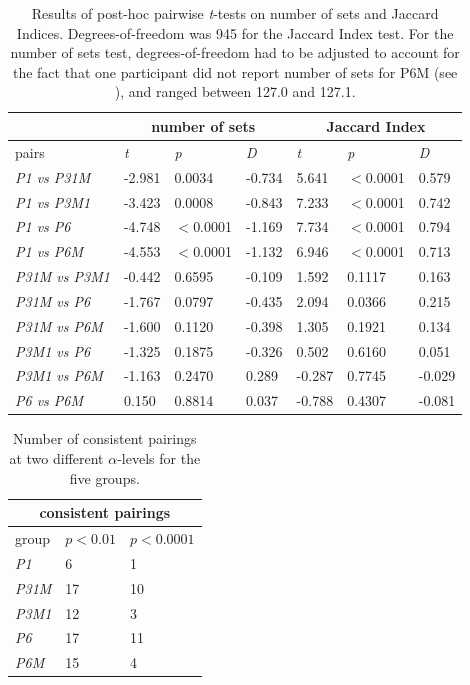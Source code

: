 \documentclass[11pt, twoside]{article}
\begin{document}
\begin{table}[H]
	\centering
	\begin{tabular}{ |p{3cm}||p{1.5cm}|p{1.5cm}|p{1.5cm}||p{1.5cm}|p{1.5cm}|p{1.5cm}| }
	\hline
	\textit{} & \multicolumn{3}{|c||}{number of sets} & \multicolumn{3}{|c|}{Jaccard Index} \\ \hline 
	pairs & \textit{t} & \textit{p} & \textit{D} & \textit{t} & \textit{p} & \textit{D} \\ \hline \hline
	\textit{P1 vs P31M} & -2.981 & 0.0034 & -0.734 & 5.641 & $<$0.0001 & 0.579 \\ \hline 
	\textit{P1 vs P3M1} & -3.423 & 0.0008 & -0.843  & 7.233 & $<$0.0001 & 0.742 \\ \hline
	\textit{P1 vs P6} & -4.748 & $<$0.0001 & -1.169 & 7.734 & $<$0.0001 & 0.794 \\ \hline
	\textit{P1 vs P6M} & -4.553 & $<$0.0001 & -1.132  & 6.946 & $<$0.0001 & 0.713 \\ \hline
	\textit{P31M vs P3M1} & -0.442 & 0.6595 & -0.109 & 1.592 & 0.1117 & 0.163 \\ \hline
	\textit{P31M vs P6} & -1.767 & 0.0797 & -0.435 & 2.094 & 0.0366 & 0.215 \\ \hline
	\textit{P31M vs P6M} & -1.600 & 0.1120 & -0.398 & 1.305 & 0.1921 & 0.134 \\ \hline
	\textit{P3M1 vs P6} & -1.325 & 0.1875 & -0.326 & 0.502 & 0.6160 & 0.051 \\ \hline
	\textit{P3M1 vs P6M} & -1.163 & 0.2470 & 0.289 & -0.287 & 0.7745 & -0.029 \\ \hline
	\textit{P6 vs P6M} & 0.150 & 0.8814 & 0.037 & -0.788 & 0.4307 & -0.081 \\ \hline
	\end{tabular}
	\caption{Results of post-hoc pairwise \textit{t}-tests on number of sets and Jaccard Indices. Degrees-of-freedom was 945 for the Jaccard Index test. For the number of sets test, degrees-of-freedom had to be adjusted to account for the fact that one participant did not report number of sets for P6M (see ), and ranged between 127.0 and 127.1.}
	\label{table:t-stats}
\end{table}

\begin{table}[H]
	\centering
	\begin{tabular}[t]{ |p{2cm}||p{2cm}|p{2cm}| }
		\hline
		\multicolumn{3}{|c|}{consistent pairings} \\
		\hline
		group & $p<0.01$ & $p<0.0001$ \\
		\hline
		\textit{P1}   & 6  & 1  \\
		\textit{P31M} & 17 & 10 \\
		\textit{P3M1} & 12 & 3  \\
		\textit{P6}   & 17 & 11 \\
		\textit{P6M}  & 15 & 4  \\
		\hline
	\end{tabular}
	\caption{Number of consistent pairings at two different $\alpha$-levels for the five groups.  }
	\label{table:pairings}
\end{table}
\end{document}
